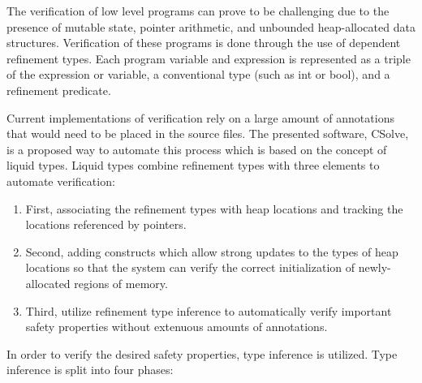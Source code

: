 
\usepackage{algorithm}
\usepackage{listings}
\usepackage{graphicx,amssymb,amsmath}
\usepackage{epstopdf}
\usepackage{setspace}
\sloppy

\oddsidemargin 0in
\evensidemargin 0in
\textwidth 6.5in
\topmargin -0.5in
\textheight 9.0in




\pagestyle{myheadings}  %
	 	
\doublespacing		
		
The verification of low level programs can prove to be challenging due to the presence of mutable state, pointer arithmetic, and unbounded heap-allocated data structures. Verification of these programs is done through the use of dependent refinement types.  Each program variable and expression is represented as a triple of the expression or variable, a conventional type (such as int or bool), and a refinement predicate.

Current implementations of verification rely on a large amount of annotations that would need to be placed in the source files. The presented software, CSolve, is a proposed way to automate this process which is based on the concept of liquid types. Liquid types combine refinement types with three elements to automate verification:

\begin{enumerate}
	\item First, associating the refinement types with heap locations and tracking the locations referenced by pointers.
	\item Second, adding constructs which allow strong updates to the types of heap locations so that the system can verify the correct initialization of newly-allocated regions of memory.
	\item Third, utilize refinement type inference to automatically verify important safety properties without extenuous amounts of annotations.
\end{enumerate}


In order to verify the desired safety properties, type inference is utilized. Type inference is split into four phases:

